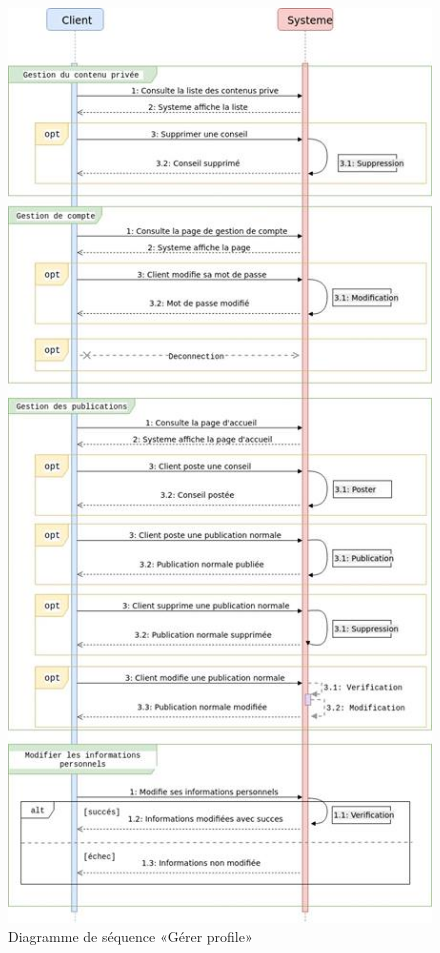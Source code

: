 \documentclass[11pt,a4paper,oneside]{book}
\begin{document}
				\begin{figure}[H]
					\centering
					\includegraphics[width=0.85\linewidth]{"Images/ch3/sequenceGererProfil"}
					\caption{Diagramme de séquence «Gérer profile»}
					\label{fig:gestion-de-profil-complet}
				\end{figure}
				
\end{document}
